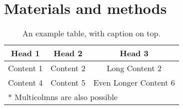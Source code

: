 

\section{Materials and methods}

\lipsum[2-5]{}

\begin{table}[htb]
    \caption{%
        An example table, with caption on top.
    }\label{tbl:example-table}
    \centering
    \begin{tabular}{ccc}
        \toprule
        Head 1 & Head 2 & Head 3 \\
        \midrule
        Content 1 & Content 2 & Long Content 2 \\
        Content 4 & Content 5 & Even Longer Content 6 \\
        \midrule
        \multicolumn{3}{l}{* Multicolmns are also possible}\\
        \bottomrule
    \end{tabular}
\end{table}

\lipsum[1-9]{}